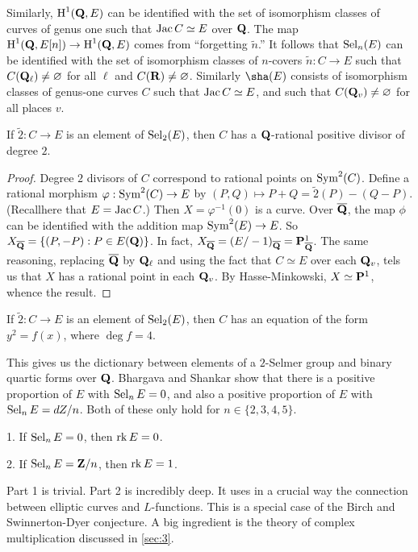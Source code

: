 Similarly, $\operatorname{H}^1(\mathbf{Q},E)$ can be identified with the set of isomorphism classes 
of curves of genus one such that $\operatorname{Jac} C\simeq E$ over $\mathbf{Q}$. The map 
$\operatorname{H}^1(\mathbf{Q},E[n]) \to \operatorname{H}^1(\mathbf{Q},E)$ comes from ``forgetting $\widetilde n$.'' 
It follows that $\operatorname{Sel}_n(E)$ can be identified with the set of isomorphism 
classes of $n$-covers $\widetilde n:C\to E$ such that 
$C(\mathbf{Q}_\ell)\ne \varnothing$ for all $\ell$ and $C(\mathbf{R})\ne\varnothing$. 
Similarly $\sha(E)$ consists of isomorphism classes of genus-one curves $C$ 
such that $\operatorname{Jac} C\simeq E$, and such that $C(\mathbf{Q}_v)\ne\varnothing$ for all 
places $v$. 

\begin{theo}
If $\widetilde 2:C\to E$ is an element of $\operatorname{Sel}_2(E)$, then $C$ has a 
$\mathbf{Q}$-rational positive divisor of degree $2$. 
\end{theo}
\begin{proof}
Degree $2$ divisors of $C$ correspond to rational points on 
$\operatorname{Sym}^2(C)$. Define a rational morphism 
$\varphi:\operatorname{Sym}^2(C) \to E$ by $(P,Q)\mapsto P+Q = \widetilde 2(P)-(Q-P)$. 
(Recallhere that $E=\operatorname{Jac} C$.) Then $X=\varphi^{-1}(0)$ is a curve. Over 
$\overline{\mathbf{Q}}$, the map $\phi$ can be identified with the addition map 
$\operatorname{Sym}^2(E) \to E$. So $X_{\overline{\mathbf{Q}}}=\{(P,-P):P\in E(\mathbf{Q})\}$. In fact, 
$X_{\overline{\mathbf{Q}}}=(E/-1)_{\overline{\mathbf{Q}}}=\mathbf{P}^1_{\overline{\mathbf{Q}}}$. The same 
reasoning, replacing $\overline{\mathbf{Q}}$ by $\mathbf{Q}_\ell$ and using the fact that 
$C\simeq E$ over each $\mathbf{Q}_v$, tels us that $X$ has a rational point in each 
$\mathbf{Q}_v$. By Hasse-Minkowski, $X\simeq \mathbf{P}^1$, whence the result. 
\end{proof}

\begin{coro}
If $\widetilde 2:C\to E$ is an element of $\operatorname{Sel}_2(E)$, then $C$ has an 
equation of the form $y^2=f(x)$, where $\deg f=4$. 
\end{coro}

This gives us the dictionary between elements of a $2$-Selmer group and 
binary quartic forms over $\mathbf{Q}$. Bhargava and Shankar show that there is a 
positive proportion of $E$ with $\operatorname{Sel}_n E=0$, and also a positive proportion 
of $E$ with $\operatorname{Sel}_n E=dZ/n$. Both of these only hold for $n\in \{2,3,4,5\}$. 

\begin{theo}
1. If $\operatorname{Sel}_n E=0$, then $\operatorname{rk} E=0$. 

2. If $\operatorname{Sel}_n E=\mathbf{Z}/n$, then $\operatorname{rk} E=1$. 
\end{theo}

Part 1 is trivial. Part 2 is incredibly deep. It uses in a crucial way the 
connection between elliptic curves and $L$-functions. This is a special case of 
the Birch and Swinnerton-Dyer conjecture. A big ingredient is the theory of 
complex multiplication discussed in \autoref{sec:3}.




